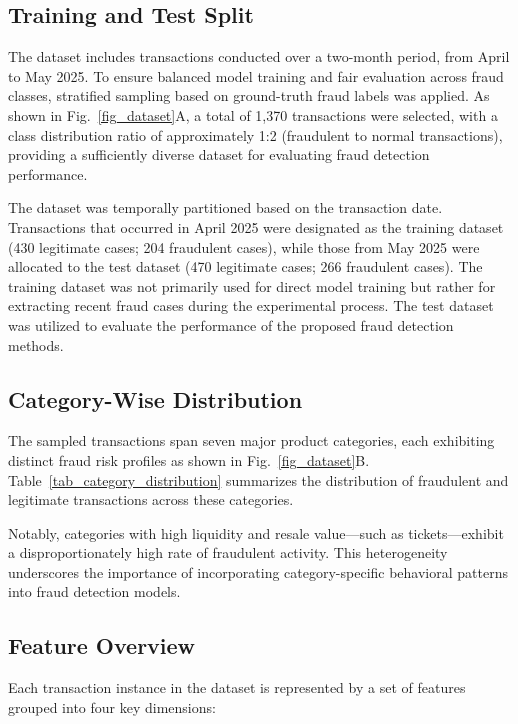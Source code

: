 \documentclass[sigconf]{acmart}
\begin{document}
\subsection{Training and Test Split}
The dataset includes transactions conducted over a two-month period, from April to May 2025. To ensure balanced model training and fair evaluation across fraud classes, stratified sampling based on ground-truth fraud labels was applied. As shown in Fig.~\ref{fig_dataset}A, a total of 1,370 transactions were selected, with a class distribution ratio of approximately 1:2 (fraudulent to normal transactions), providing a sufficiently diverse dataset for evaluating fraud detection performance.

The dataset was temporally partitioned based on the transaction date. Transactions that occurred in April 2025 were designated as the training dataset (430 legitimate cases; 204 fraudulent cases), while those from May 2025 were allocated to the test dataset (470 legitimate cases; 266 fraudulent cases). The training dataset was not primarily used for direct model training but rather for extracting recent fraud cases during the experimental process. The test dataset was utilized to evaluate the performance of the proposed fraud detection methods.



\subsection{Category-Wise Distribution}
The sampled transactions span seven major product categories, each exhibiting distinct fraud risk profiles as shown in Fig.~\ref{fig_dataset}B. Table~\ref{tab_category_distribution} summarizes the distribution of fraudulent and legitimate transactions across these categories.

Notably, categories with high liquidity and resale value—such as tickets—exhibit a disproportionately high rate of fraudulent activity. This heterogeneity underscores the importance of incorporating category-specific behavioral patterns into fraud detection models.



\subsection{Feature Overview}\label{feature_overview}
Each transaction instance in the dataset is represented by a set of features grouped into four key dimensions:
\end{document}
